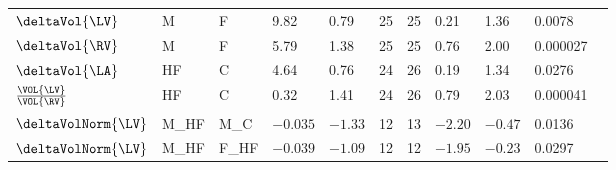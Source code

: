\begin{landscape}
\begin{table}[ht]
\begin{tabular}{lllllllllll}
$\deltaVol{\LV}$    & M     & F     & 9.82  & 0.79  & 25 & 25 & 0.21  & 1.36 & 0.0078   \\
$\deltaVol{\RV}$    & M     & F     & 5.79  & 1.38  & 25 & 25 & 0.76  & 2.00 & 0.000027 \\
$\deltaVol{\LA}$    & HF    & C     & 4.64  & 0.76  & 24 & 26 & 0.19  & 1.34 & 0.0276   \\
$\frac{\VOL{\LV}}{\VOL{\RV}}$ & HF & C & 0.32 & 1.41 & 24 & 26 & 0.79 & 2.03 & 0.000041 \\
$\deltaVolNorm{\LV}$ & M\_HF & M\_C  & $-0.035$ & $-1.33$ & 12 & 13 & $-2.20$ & $-0.47$ & 0.0136 \\
$\deltaVolNorm{\LV}$ & M\_HF & F\_HF & $-0.039$ & $-1.09$ & 12 & 12 & $-1.95$ & $-0.23$ & 0.0297 \\
\bottomrule
\end{tabular}
\label{tab:all-significant-comparisons}
\end{table}
\end{landscape}
